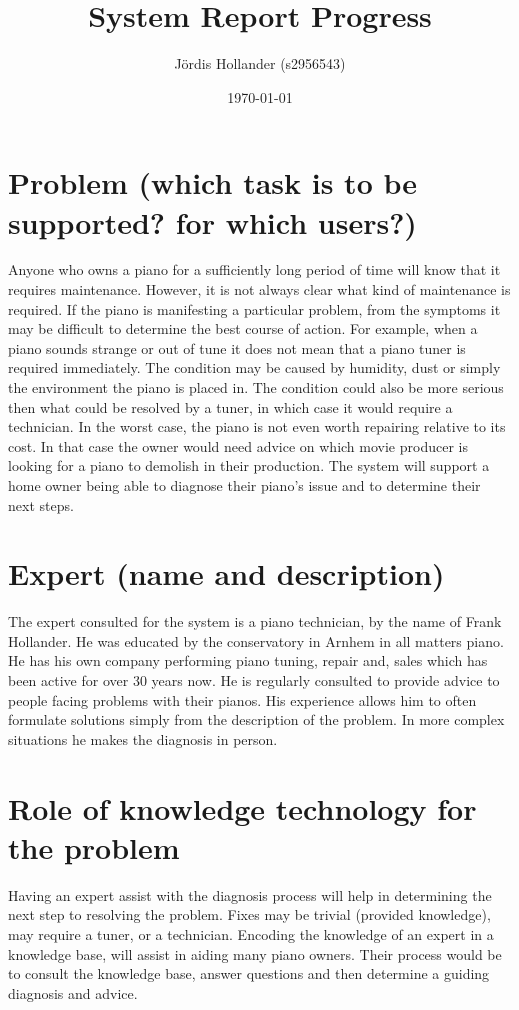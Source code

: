 \documentclass[12pt]{article}
\title{
  System Report Progress
}
\author{
  J\"{o}rdis Hollander (s2956543)\\
}
\date{\today}
\begin{document}
\maketitle

\section{Problem (which task is to be supported? for which users?)}

Anyone who owns a piano for a sufficiently long period of time will know that it
requires maintenance. However, it is not always clear what kind of maintenance
is required. If the piano is manifesting a particular problem, from the symptoms
it may be difficult to determine the best course of action. For example, when a
piano sounds strange or out of tune it does not mean that a piano tuner is
required immediately. The condition may be caused by humidity, dust or simply
the environment the piano is placed in. The condition could also be more serious
then what could be resolved by a tuner, in which case it would require a
technician. In the worst case, the piano is not even
worth repairing relative to its cost. In that case the owner would need advice on
which movie producer is looking for a piano to demolish in their production.
The system will support a home owner being able to diagnose their piano's issue
and to determine their next steps.

\section{Expert (name and description)}
The expert consulted for the system is a piano technician, by the name of Frank
Hollander. He was educated by the conservatory in Arnhem in all matters piano.
He has his own company performing piano tuning, repair and, sales which has been
active for over 30 years now. He is regularly consulted to provide advice to
people facing problems with their pianos. His experience allows him to often
formulate solutions simply from the description of the problem. In more complex
situations he makes the diagnosis in person.

\section{Role of knowledge technology for the problem}
Having an expert assist with the diagnosis process will help in determining the
next step to resolving the problem. Fixes may be trivial (provided knowledge),
may require a tuner, or a technician. Encoding the knowledge of an expert in a
knowledge base, will assist in aiding many piano owners. Their process would be
to consult the knowledge base, answer questions and then determine a guiding
diagnosis and advice.
\end{document}
